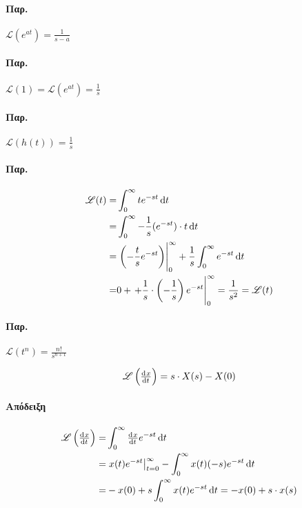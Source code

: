 \documentclass[11pt,a4paper,titlepage,final]{article}
\begin{document}
\paragraph{Παρ.}
\(
\mathscr{L}(e^{at}) = \frac{1}{s-a}
\)

\paragraph{Παρ.}
\(
\mathscr{L}(1) = \mathscr{L}(e^{at})=\frac{1}{s}
\)

\paragraph{Παρ.}
\(
\mathscr{L}\left(h(t)\right) = \frac{1}{s}
\)

\paragraph{Παρ.}
\begin{align*}
\mathscr{L}(t)=&\int_0^\infty te^{-st}\dif t
\\=&
\int_0^\infty -\frac{1}{s} (e^{-st})\cdot t \dif t
\\=&
\left.\left( -\frac{t}{s}e^{-st}\right)\right|_0^\infty + \frac{1}{s}\int_0^\infty e^{-st}\dif t
\\=&
0+\left. + \frac{1}{s}\cdot\left(-\frac{1}{s}\right) e^{-st}\right|_0^\infty = \frac{1}{s^2}=\mathscr{L}(t)
\end{align*}

\paragraph{Παρ.}
\(
\mathscr{L}(t^n) = \frac{n!}{s^{n+1}}
\)

\begin{theorem*}{}
\[
\mathscr{L}\left(
\od{x}{t}
\right)
= s\cdot X(s)-X(0)
\]
\end{theorem*}
\paragraph{Απόδειξη}
\begin{align*}
\mathscr{L}\left(
\od{x}{t}
\right) =& \int_0^\infty\od{x}{t} e^{-st}\dif t
\\ =&
\left.x(t)e^{-st}\right|_{t=0}^\infty - \int_0^\infty x(t)(-s)e^{-st} \dif t
\\=&
-x(0)+s\int_0^\infty x(t)e^{-st}\dif t = -x(0)+s\cdot x(s)
\end{align*}
\end{document}
